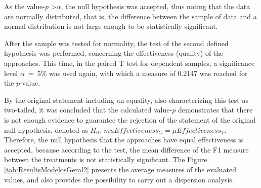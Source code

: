 As the value-$p$ \textgreater $\alpha$, the null hypothesis was accepted, thus noting that the data are normally distributed, that is, the difference between the sample of data and a normal distribution is not large enough to be statistically significant.

After the sample was tested for normality, the test of the second defined hypothesis was performed, concerning the effectiveness (quality) of the approaches.
This time, in the paired T test for dependent samples, a significance level $\alpha$~=~5\% was used again, with which a measure of 0.2147 was reached for the $p$-value.

By the original statement including an equality, also characterizing this test as two-tailed, it was concluded that the calculated value-$p$ demonstrates that there is not enough evidence to guarantee the rejection of the statement of the original null hypothesis, denoted as $H_0 : \ mu Effectiveness_G = \mu Effectiveness_T$.
Therefore, the null hypothesis that the approaches have equal effectiveness is accepted, because according to the test, the mean difference of the F1 measure between the treatments is not statistically significant.
The Figure \ref{tab:ResultsModelosGeral2} presents the average measures of the evaluated values, and also provides the possibility to carry out a dispersion analysis.

